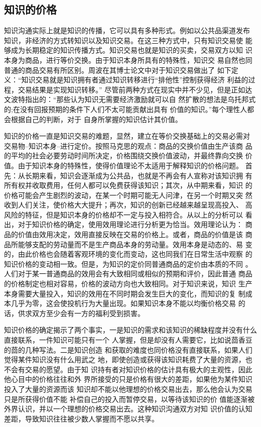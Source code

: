 \documentclass[12pt,a4paper]{ctexart}
\begin{document}
\subsection{知识的价格}

知识沟通实际上就是知识的传播，它可以具有多种形式。例如以公共品渠道发布
知识，非经济的方式转知识以及知识交易。在这三种方式中，只有知识交易使
能够成为长期稳定的知识传播方式。知识交易也就是知识的买卖，交易双方以知
识本身为商品，进行等价交换。由于知识本身所具有的特殊性，知识交
易自然也同普通的商品交易有所区别。周波在其博士论文中对于知识交易做出了
如下定义：“知识交易就是知识拥有者通过知识转移进行“排他性”控制获得经济
利益的过程，交易结果是实现知识转移。”\cite{zhoubo2006}
尽管前两种方式在现实中并不少见，但是正如达
文波特指出的：“那些认为知识无需要经济激励就可以自
然扩散的想法是乌托邦式的;在没有回报预期的条件下人们不太可能贡献出具有
价值的知识。”\cite{davenport1998wko}每个理性人都会根据自己的判断，对于
自身所掌握的知识估计其价值。

知识的价格一直是知识交易的难题，显然，建立在等价交换基础上的交易必需对
交易物--知识本身--进行定价。按照马克思的观点：商品的交换价值由生产该商
品的平均的社会必要劳动时间所决定，价格围绕交换价值波动，并最终靠向交换
价值。由于知识本身的特殊性，使得价值理论不太适用于解释知识的价格问题。
首先：从长期来看，知识会逐渐成为公共品，也就是不再会有人宣称对该知识拥
有所有权并收取费用，任何人都可以免费获得该知识；其次，从中期来看，知识
的价格可能会产生剧烈的波动，在某一个时期可能无人问津，在另一个时期又突
然收到人们关注，使价格大大提升；再次，知识的创新已经越来越呈现高投入、
高风险的特征，但是知识本身的价格却不一定与投入相符合。从以上的分析可以
看出，对于知识价格的确定，使用效用理论进行分析更为恰当。效用理论认为：
商品的价值由效用决定，效用直接反映在交易的价格上。或者，商品的价值是该
商品所能够支配的劳动量而不是生产商品本身的劳动量。效用本身是动态的、易
变的，由此价格也会随着客观环境的变化而变动，这也同我们在日常生活中观察
的知识价格的变动相一致。但是，为知识的定价同普通商品的定价由本质的不同
。人们对于某一普通商品的效用会有大致相同或相似的预期和评价，因此普通
商品的价格制定也相对容易，价格的波动方向也大致相同。对于知识来说，知识
生产本身需要大量投入，知识的效用在不同时期会发生巨大的变化，而知识的复
制成本几乎为零，这会使投机行为大量出现。如果知识本身不能以均衡价格交易
的话，供求双方至少会有一方的福利受到损害。

知识价格的确定揭示了两个事实，一是知识的需求和该知识的稀缺程度并没有什么直接联系，一件知识可能只有一个
  人掌握，但是却没有人需要它，比如说茴香豆的茴的几种写法。二是知识创造
  和获取的难度也同价格没有直接联系，如果人们觉得某件知识没有什么用武之
  地，即使创造或获得该知识耗费了大量的资源，也不会有交易的愿望。由于知
  识持有者对知识价格的估计具有极大的主观性，因此他心目中的价格往往和外
  界所接受的只是价格有很大的差距，如果他为某件知识投入了大量的资源而该
  知识却不能以他理想的价格交易出去，那么他会认为交易只是所获得价值不能
  补偿自己的投入而暂停交易，以等待该知识的价
  值能逐渐被外界认识，并以一个理想的价格交易出去。这种知识沟通双方对知
  识价值的认知差距，导致知识往往被少数人掌握而不愿以共享。
\end{document}
